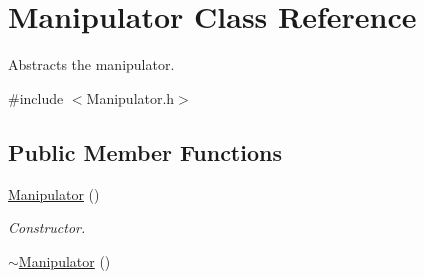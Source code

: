 \hypertarget{class_r_j_f_r_c2011_1_1_manipulator}{
\section{Manipulator Class Reference}
\label{class_r_j_f_r_c2011_1_1_manipulator}
}


Abstracts the manipulator.  




{\ttfamily \#include $<$Manipulator.h$>$}

\subsection*{Public Member Functions}
\begin{DoxyCompactItemize}
\item 
\hyperlink{class_r_j_f_r_c2011_1_1_manipulator_aa17e96e9120f0779c9d478e121b663e1}{Manipulator} ()
\begin{DoxyCompactList}\small\item\em Constructor. \item\end{DoxyCompactList}\item 
\hypertarget{class_r_j_f_r_c2011_1_1_manipulator_a5326e01c30be9c281792a4dc8d3d64ff}{
\hyperlink{class_r_j_f_r_c2011_1_1_manipulator_a5326e01c30be9c281792a4dc8d3d64ff}{$\sim$Manipulator} ()}
\label{class_r_j_f_r_c2011_1_1_manipulator_a5326e01c30be9c281792a4dc8d3d64ff}


\end{DoxyCompactItemize}
